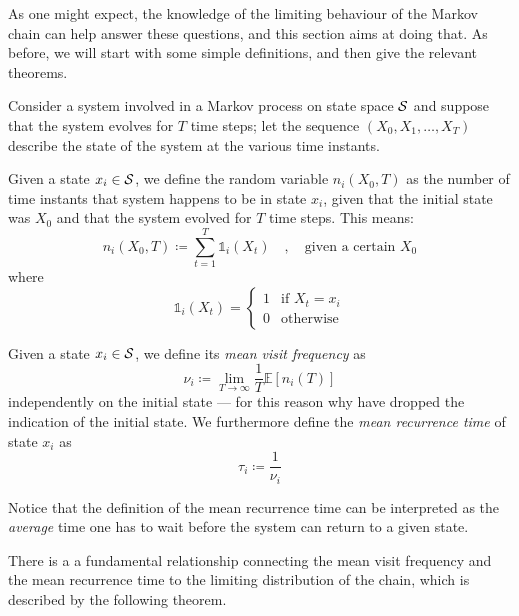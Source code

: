 As one might expect, the knowledge of the limiting behaviour of the Markov chain can help answer these questions, and this section aims at doing that. As before, we will start with some simple definitions, and then give the relevant theorems.

\medskip
Consider a system involved in a Markov process on state space $\mathcal{S}$ and suppose that the system evolves for $T$ time steps; let the sequence $(X_0, X_1, \dots, X_T)$ describe the state of the system at the various time instants.
\begin{ndef} 
    Given a state $x_i \in \mathcal{S}$, we define the random variable $n_i (X_0, T)$ as the number of time instants that system happens to be in state $x_i$, given that the initial state was $X_0$ and that the system evolved for $T$ time steps. This means:
    \begin{equation}
        n_i (X_0, T) \coloneqq \sum_{t = 1}^T \mathds{1}_i(X_t) \quad , \quad \text{given a certain }X_0
    \end{equation}
    where
    \begin{equation}
        \mathds{1}_i(X_t) =
        \begin{cases}
            1 & \text{if $X_t = x_i$} \\
            0 & \text{otherwise}
        \end{cases}
    \end{equation}
\end{ndef}
\begin{ndef}  \label{def:nu-tau}
    Given a state $x_i \in \mathcal{S}$, we define its \emph{mean visit frequency} as
    \begin{equation}
        \nu_i \coloneqq \lim_{T\rightarrow \infty} \frac{1}{T} \mathds{E} \left[ n_i (T) \right]
    \end{equation}
    independently on the initial state --- for this reason why have dropped the indication of the initial state.
    We furthermore define the \emph{mean recurrence time} of state $x_i$ as
    \begin{equation} \label{def:mean_rec_time}
        \tau_i \coloneqq \frac{1}{\nu_i}
    \end{equation}
\end{ndef}
Notice that the definition of the mean recurrence time can be interpreted as the \emph{average} time one has to wait before the system can return to a given state.

\medskip
There is a a fundamental relationship connecting the mean visit frequency and the mean recurrence time to the limiting distribution of the chain, which is described by the following theorem.

